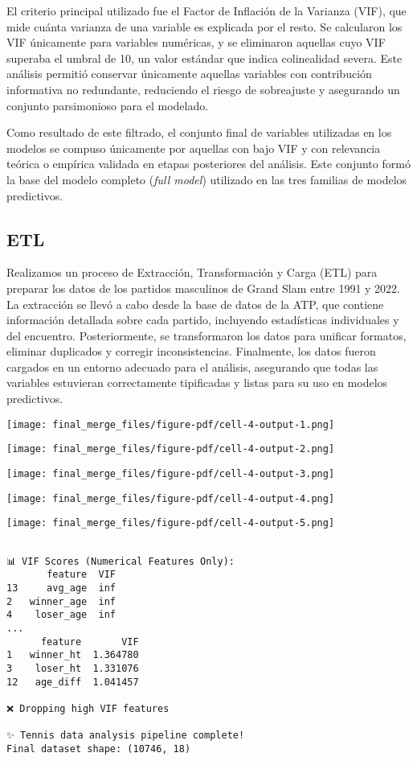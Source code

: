 \documentclass[
  letterpaper,
  DIV=11,
  numbers=noendperiod]{scrartcl}
\begin{document}
El criterio principal utilizado fue el Factor de Inflación de la
Varianza (VIF), que mide cuánta varianza de una variable es explicada
por el resto. Se calcularon los VIF únicamente para variables numéricas,
y se eliminaron aquellas cuyo VIF superaba el umbral de 10, un valor
estándar que indica colinealidad severa. Este análisis permitió
conservar únicamente aquellas variables con contribución informativa no
redundante, reduciendo el riesgo de sobreajuste y asegurando un conjunto
parsimonioso para el modelado.

Como resultado de este filtrado, el conjunto final de variables
utilizadas en los modelos se compuso únicamente por aquellas con bajo
VIF y con relevancia teórica o empírica validada en etapas posteriores
del análisis. Este conjunto formó la base del modelo completo
(\emph{full model}) utilizado en las tres familias de modelos
predictivos.

\hypertarget{etl}{%
\subsection{ETL}\label{etl}}

Realizamos un proceso de Extracción, Transformación y Carga (ETL) para
preparar los datos de los partidos masculinos de Grand Slam entre 1991 y
2022. La extracción se llevó a cabo desde la base de datos de la ATP,
que contiene información detallada sobre cada partido, incluyendo
estadísticas individuales y del encuentro. Posteriormente, se
transformaron los datos para unificar formatos, eliminar duplicados y
corregir inconsistencias. Finalmente, los datos fueron cargados en un
entorno adecuado para el análisis, asegurando que todas las variables
estuvieran correctamente tipificadas y listas para su uso en modelos
predictivos.

\texttt{[image: final\_merge\_files/figure-pdf/cell-4-output-1.png]}

\texttt{[image: final\_merge\_files/figure-pdf/cell-4-output-2.png]}

\texttt{[image: final\_merge\_files/figure-pdf/cell-4-output-3.png]}

\texttt{[image: final\_merge\_files/figure-pdf/cell-4-output-4.png]}

\texttt{[image: final\_merge\_files/figure-pdf/cell-4-output-5.png]}

\begin{verbatim}

📊 VIF Scores (Numerical Features Only):
       feature  VIF
13     avg_age  inf
2   winner_age  inf
4    loser_age  inf
...
      feature       VIF
1   winner_ht  1.364780
3    loser_ht  1.331076
12   age_diff  1.041457

❌ Dropping high VIF features

✨ Tennis data analysis pipeline complete!
Final dataset shape: (10746, 18)
\end{verbatim}
\end{document}
